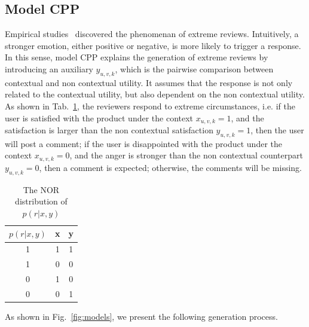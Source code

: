 \documentclass[sigconf]{acmart}
\begin{document}
\subsection{Model CPP}
Empirical studies~\cite{Wojnicki2008Word} discovered the phenomenan of extreme reviews. Intuitively, a stronger emotion, either positive or negative, is more likely to trigger a response. In this sense, model CPP explains the generation of extreme reviews by introducing an auxiliary $y_{u,v,k}$, which is the pairwise comparison between contextual and non contextual utility. It assumes that the response is not only related to the contextual utility, but also dependent on the non contextual utility. As shown in Tab.~\ref{tab:CPP}, the reviewers respond to extreme circumstances, i.e. if the user is satisfied with the product under the context $x_{u,v,k}=1$, and the satisfaction is larger than the non contextual satisfaction $y_{u,v,k}=1$, then the user will post a comment;  if the user is disappointed with the product under the context $x_{u,v,k}=0$, and the anger is stronger than the non contextual counterpart $y_{u,v,k}=0$, then a comment is expected; otherwise, the comments will be missing. 
   
\begin{table}
\caption{The NOR distribution of $p(r|x,y)$}\label{tab:CPP}
\centering
\begin{tabular}{|c|c|c|}
\hline\hline
$p(r|x,y)$ & x & y\\\hline
1 & 1 & 1 \\\hline
1 & 0 & 0 \\\hline
0 & 1 & 0 \\\hline
0 & 0 & 1 \\\hline
\hline
\end{tabular}
\end{table}
As shown in Fig.~\ref{fig:models}, we present the following generation process.
\end{document}

